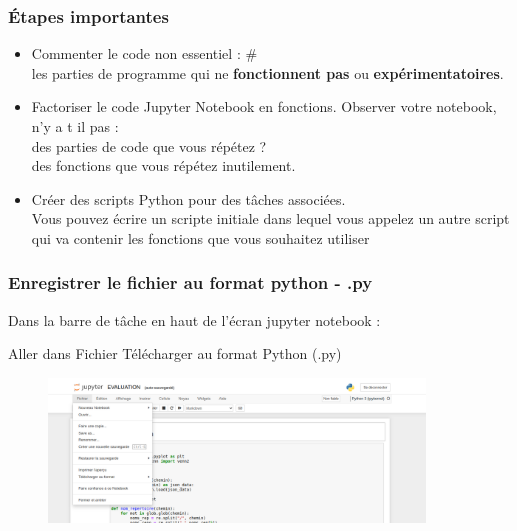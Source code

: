 \begin{frame}
 \frametitle{Étapes importantes}
\begin{itemize}
\item \textcolor{green}{} Commenter le code non essentiel : \# \\
 les parties de programme qui ne \textbf{fonctionnent pas} ou \textbf{expérimentatoires}.

\pause

\item \textcolor{green}{} Factoriser le code Jupyter Notebook en fonctions. Observer votre notebook, n'y a t il pas :\\
 des parties de code que vous répétez ?\\
 des fonctions que vous répétez inutilement.

\pause

\item \textcolor{green}{} Créer des scripts Python pour des tâches associées.\\
 Vous pouvez écrire un scripte initiale dans lequel vous appelez un autre script qui va contenir les fonctions que vous souhaitez utiliser
\end{itemize} 
\end{frame}


\begin{frame}
  \frametitle{Enregistrer le fichier au format python - .py}
  Dans la barre de tâche en haut de l'écran jupyter notebook :
  
  
  Aller dans Fichier   Télécharger au format   Python (.py)
  
  \begin{figure}
  \includegraphics[width=10cm]{images/ynpb_convert_py.png}
  \end{figure}
 
\end{frame}



%  



